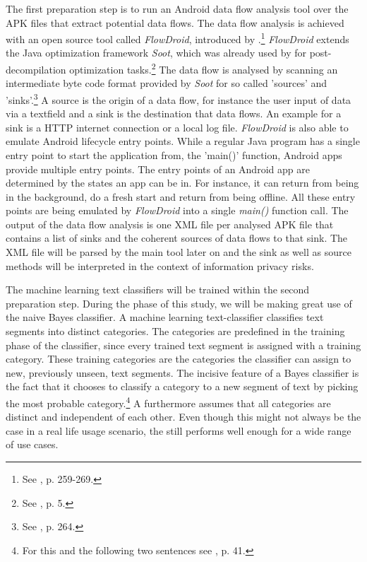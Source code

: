 The first preparation step is to run an Android data flow analysis tool over the APK files that extract potential data flows.
The data flow analysis is achieved with an open source tool called \textit{FlowDroid}, introduced by \cite{Arzt2014}.\footnote{See \cite{Arzt2014}, p. 259-269.}
\textit{FlowDroid} extends the Java optimization framework \textit{Soot}, which was already used by \cite{Enck2011} for post-decompilation optimization tasks.\footnote{See \cite{Enck2011}, p. 5.}
The data flow is analysed by scanning an intermediate byte code format provided by \textit{Soot} for so called 'sources' and 'sinks'.\footnote{See \cite{Arzt2014}, p. 264.}
A source is the origin of a data flow, for instance the user input of data via a textfield and a sink is the destination that data flows.
An example for a sink is a HTTP internet connection or a local log file.
\textit{FlowDroid} is also able to emulate Android lifecycle entry points.
While a regular Java program has a single entry point to start the application from, the 'main()' function, Android apps provide multiple entry points.
The entry points of an Android app are determined by the states an app can be in. 
For instance, it can return from being in the background, do a fresh start and return from being offline.
All these entry points are being emulated by \textit{FlowDroid} into a single \textit{main()} function call.
The output of the data flow analysis is one XML file per analysed APK file that contains a list of sinks and the coherent sources of data flows to that sink.
The XML file will be parsed by the main \sca tool later on and the sink as well as source methods will be interpreted in the context of information privacy risks.

The machine learning text classifiers will be trained within the second preparation step.
During the \sca phase of this study, we will be making great use of the naive Bayes classifier.
A machine learning text-classifier classifies text segments into distinct categories. 
The categories are predefined in the training phase of the classifier, since every trained text segment is assigned with a training category.
These training categories are the categories the classifier can assign to new, previously unseen, text segments.
The incisive feature of a Bayes classifier is the fact that it chooses to classify a category to a new segment of text by picking the most probable category.\footnote{For this and the following two sentences see \cite{Rish2001}, p. 41.}
A \nbc furthermore assumes that all categories are distinct and independent of each other. 
Even though this might not always be the case in a real life usage scenario, the \nbc still performs well enough for a wide range of use cases.

